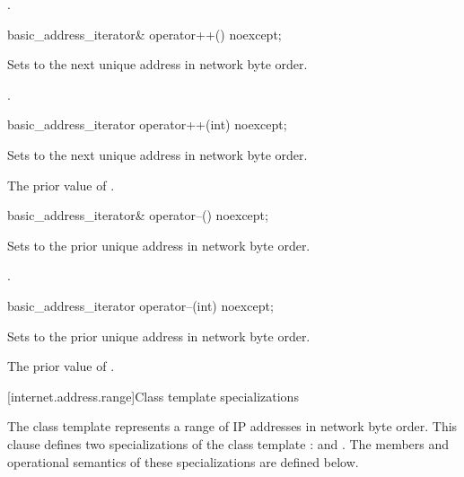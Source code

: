 \begin{itemdescr}
\pnum
\returns {}.
\end{itemdescr}

\begin{itemdecl}
basic_address_iterator& operator++() noexcept;
\end{itemdecl}

\begin{itemdescr}
\pnum
\effects Sets  to the next unique address in network byte order.

\pnum
\returns {}.
\end{itemdescr}

\begin{itemdecl}
basic_address_iterator operator++(int) noexcept;
\end{itemdecl}

\begin{itemdescr}
\pnum
\effects Sets  to the next unique address in network byte order.

\pnum
\returns The prior value of .
\end{itemdescr}

\begin{itemdecl}
basic_address_iterator& operator--() noexcept;
\end{itemdecl}

\begin{itemdescr}
\pnum
\effects Sets  to the prior unique address in network byte order.

\pnum
\returns {}.
\end{itemdescr}

\begin{itemdecl}
basic_address_iterator operator--(int) noexcept;
\end{itemdecl}

\begin{itemdescr}
\pnum
\effects Sets  to the prior unique address in network byte order.

\pnum
\returns The prior value of .
\end{itemdescr}



%
[internet.address.range]{Class template  specializations}

\pnum
The class template  represents a range of IP addresses in network byte order. This clause defines two specializations of the class template :  and . The members and operational semantics of these specializations are defined below.

